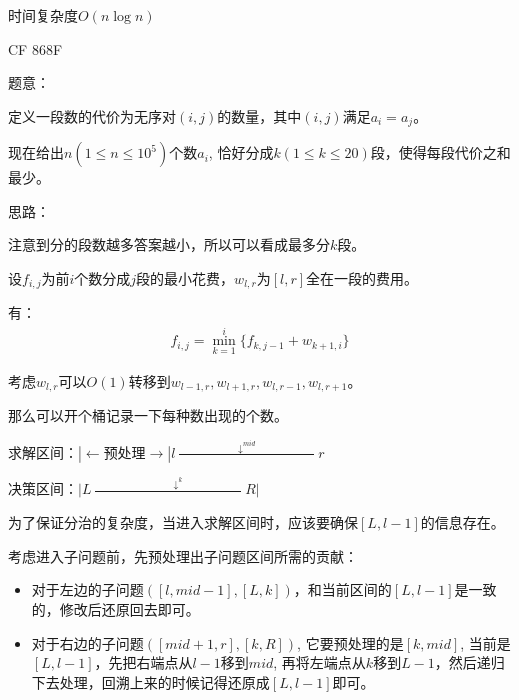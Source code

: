 时间复杂度$O(n \log n)$

CF 868F\par

题意：\par
定义一段数的代价为无序对$(i, j)$的数量，其中$(i, j)$满足$a_i = a_j$。\par
现在给出$n(1 \leq n \leq 10^5)$个数$a_i$, 恰好分成$k(1 \leq k \leq 20)$段，使得每段代价之和最少。\par

思路：\par
注意到分的段数越多答案越小，所以可以看成最多分$k$段。\par
设$f_{i, j}$为前$i$个数分成$j$段的最小花费，$w_{l, r}$为$[l, r]$全在一段的费用。\par
有：
\begin{eqnarray*}
f_{i,j}=\min\limits_{k=1}^{i}\{f_{k,j-1}+w_{k + 1,i}\}
\end{eqnarray*}

考虑$w_{l, r}$可以$O(1)$转移到$w_{l - 1, r}, w_{l + 1, r}, w_{l, r - 1}, w_{l, r + 1}$。\par
那么可以开个桶记录一下每种数出现的个数。\par

求解区间：$|\gets \mbox{预处理} \to|l\frac{\qquad\qquad\qquad\downarrow^{mid}\qquad\qquad\qquad}{}r$\par
决策区间：$|L\frac{\qquad\qquad\qquad\qquad\downarrow^{k}\qquad\qquad\qquad}{}R|$\par


为了保证分治的复杂度，当进入求解区间时，应该要确保$[L, l - 1]$的信息存在。\par

考虑进入子问题前，先预处理出子问题区间所需的贡献：
\begin{itemize}
\item 对于左边的子问题$([l, mid - 1], [L, k])$，和当前区间的$[L, l - 1]$是一致的，修改后还原回去即可。
\item 对于右边的子问题$([mid + 1, r], [k, R])$, 它要预处理的是$[k, mid]$, 当前是$[L, l - 1]$，先把右端点从$l - 1$移到$mid$, 再将左端点从$k$移到$L - 1$，然后递归下去处理，回溯上来的时候记得还原成$[L, l - 1]$即可。
\end{itemize}


